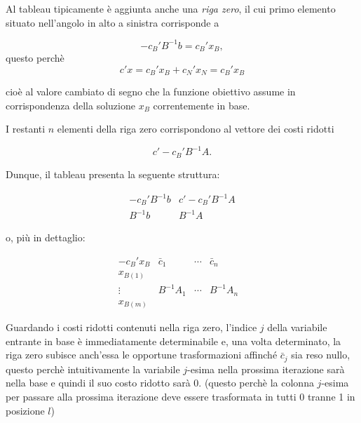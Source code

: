 Al tableau tipicamente è aggiunta anche una \textit{riga zero},
il cui primo elemento situato nell'angolo in alto a sinistra
corrisponde a

\[
-c_B' B^{-1}b = c_B' x_B,
\]
questo perchè
\[
c' x = c_B' x_B + c_N'x_N = c_B' x_B 
\]

cioè al valore cambiato di segno che la funzione obiettivo assume
in corrispondenza della soluzione $x_B$ correntemente in base.

I restanti $n$ elementi della riga zero corrispondono al vettore
dei costi ridotti

\[
c' - c_B' B^{-1}A.
\]

Dunque, il tableau presenta la seguente struttura:

\[
\boxed{
\begin{array}{c|c}
-c_B' B^{-1}b & c' - c_B' B^{-1}A \\
\hline
B^{-1}b & B^{-1}A
\end{array}
}
\]

o, più in dettaglio:

\[
\boxed{
\begin{array}{c|cccc}
-c_B' x_B & \bar{c}_1 & \cdots & \bar{c}_n \\
\hline
x_{B(1)} & & & & \\
\vdots & B^{-1}A_1 & \cdots & B^{-1}A_n & \\
x_{B(m)} & & & &
\end{array}
}
\]

Guardando i costi ridotti contenuti nella riga zero,
l'indice $j$ della variabile entrante in base è immediatamente
determinabile e, una volta determinato, la riga zero subisce
anch'essa le opportune trasformazioni affinché $\bar{c}_j$
sia reso nullo, questo perchè intuitivamente la variabile $j$-esima nella prossima iterazione sarà nella base e quindi il suo costo ridotto sarà 0. (questo perchè la colonna $j$-esima per passare alla prossima iterazione deve essere trasformata in tutti 0 tranne 1 in posizione $l$)


\newpage

